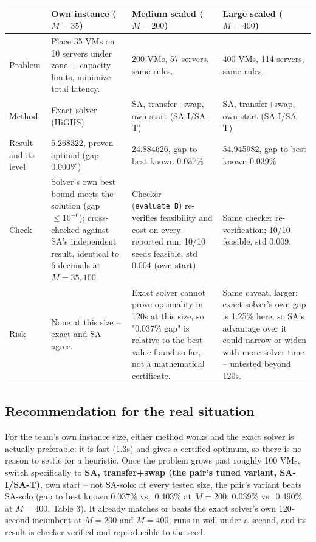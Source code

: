 \documentclass[11pt,a4paper]{article}
\begin{document}
\begin{tabularx}{\textwidth}{@{}lXXX@{}}
\toprule
 & Own instance ($M{=}35$) & Medium scaled ($M{=}200$) & Large scaled ($M{=}400$)\\
\midrule
Problem & Place 35 VMs on 10 servers under zone + capacity limits, minimize total latency. & 200 VMs, 57 servers, same rules. & 400 VMs, 114 servers, same rules.\\
Method & Exact solver (HiGHS) & SA, transfer+swap, own start (SA-I/SA-T) & SA, transfer+swap, own start (SA-I/SA-T)\\
Result and its level & 5.268322, proven optimal (gap 0.000\%) & 24.884626, gap to best known 0.037\% & 54.945982, gap to best known 0.039\%\\
Check & Solver's own best bound meets the solution (gap $\le10^{-6}$); cross-checked against SA's independent result, identical to 6 decimals at $M{=}35,100$. & Checker (\texttt{evaluate\_B}) re-verifies feasibility and cost on every reported run; 10/10 seeds feasible, std 0.004 (own start). & Same checker re-verification; 10/10 feasible, std 0.009.\\
Risk & None at this size -- exact and SA agree. & Exact solver cannot prove optimality in 120s at this size, so "0.037\% gap" is relative to the best value found so far, not a mathematical certificate. & Same caveat, larger: exact solver's own gap is 1.25\% here, so SA's advantage over it could narrow or widen with more solver time -- untested beyond 120s.\\
\bottomrule
\end{tabularx}

\subsection*{Recommendation for the real situation}
For the team's own instance size, either method works and the exact solver is actually preferable: it is fast (1.3s) and gives a certified optimum, so there is no reason to settle for a heuristic. Once the problem grows past roughly 100 VMs, switch specifically to \textbf{SA, transfer+swap (the pair's tuned variant, SA-I/SA-T)}, own start -- not SA-solo: at every tested size, the pair's variant beats SA-solo (gap to best known 0.037\% vs.\ 0.403\% at $M{=}200$; 0.039\% vs.\ 0.490\% at $M{=}400$, Table 3). It already matches or beats the exact solver's own 120-second incumbent at $M{=}200$ and $M{=}400$, runs in well under a second, and its result is checker-verified and reproducible to the seed.
\end{document}
